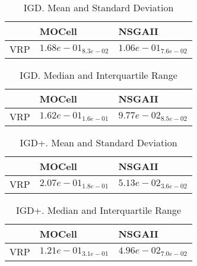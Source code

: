 \documentclass{article}
\begin{document}
\begin{table}
\caption{IGD. Mean and Standard Deviation}
\label{table: IGD}
\centering
\begin{scriptsize}
\begin{tabular}{lll}
\hline & MOCell &  NSGAII\\
\hline 
VRP & \cellcolor{gray25}$  1.68e-01_{ 8.3e-02}$ & \cellcolor{gray95}$  1.06e-01_{ 7.6e-02}$ \\
\hline
\end{tabular}
\end{scriptsize}
\end{table}

\begin{table}
\caption{IGD. Median and Interquartile Range}
\label{table: IGD}
\centering
\begin{scriptsize}
\begin{tabular}{lll}
\hline & MOCell &  NSGAII\\
\hline 
VRP & \cellcolor{gray25}$  1.62e-01_{ 1.6e-01}$ & \cellcolor{gray95}$  9.77e-02_{ 8.5e-02}$ \\
\hline
\end{tabular}
\end{scriptsize}
\end{table}

\begin{table}
\caption{IGD+. Mean and Standard Deviation}
\label{table: IGD+}
\centering
\begin{scriptsize}
\begin{tabular}{lll}
\hline & MOCell &  NSGAII\\
\hline 
VRP & \cellcolor{gray25}$  2.07e-01_{ 1.8e-01}$ & \cellcolor{gray95}$  5.13e-02_{ 3.6e-02}$ \\
\hline
\end{tabular}
\end{scriptsize}
\end{table}

\begin{table}
\caption{IGD+. Median and Interquartile Range}
\label{table: IGD+}
\centering
\begin{scriptsize}
\begin{tabular}{lll}
\hline & MOCell &  NSGAII\\
\hline 
VRP & \cellcolor{gray25}$  1.21e-01_{ 3.1e-01}$ & \cellcolor{gray95}$  4.96e-02_{ 7.0e-02}$ \\
\hline
\end{tabular}
\end{scriptsize}
\end{table}
\end{document}
